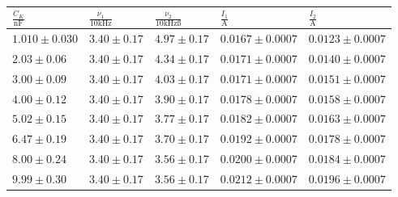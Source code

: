 \documentclass[11pt,ngerman,a4paper]{article}
\begin{document}
\begin{table}
\centering
\begin{tabular}{lllll}
\toprule
{$\frac{C_K}{\si{\nano\farad}}$} &{ $\frac{\nu_1}{10\si{\kilo\Hz}}$} &{ $\frac{\nu_2}{10\si{\kilo\Hz}ß}$} &{ $\frac{I_1}{\si{\ampere}}$} &{ $\frac{I_2}{\si{\ampere}}$ }\\
\midrule
 $1.010 \pm 0.030$  & $3.40 \pm 0.17$   & $4.97 \pm 0.17$  & $0.0167 \pm 0.0007$  & $0.0123 \pm 0.0007$ \\
 $2.03 \pm 0.06$  & $3.40 \pm 0.17$  & $4.34 \pm 0.17$  & $0.0171 \pm 0.0007$  & $0.0140 \pm 0.0007$ \\
 $3.00 \pm 0.09$  & $3.40 \pm 0.17 $  & $4.03 \pm 0.17$  & $0.0171 \pm 0.0007$  & $0.0151 \pm 0.0007$ \\
 $4.00 \pm 0.12$  & $3.40 \pm 0.17 $  & $3.90 \pm 0.17$  & $0.0178 \pm 0.0007$  & $0.0158 \pm 0.0007$ \\
 $5.02 \pm 0.15$  & $3.40 \pm 0.17$  & $3.77 \pm 0.17$  & $0.0182 \pm 0.0007$  & $0.0163 \pm 0.0007$ \\
 $6.47 \pm 0.19$  & $3.40 \pm 0.17$  & $3.70 \pm 0.17$  & $0.0192 \pm 0.0007$  & $0.0178 \pm 0.0007$ \\
 $8.00 \pm 0.24$  & $3.40 \pm 0.17$  & $3.56 \pm 0.17$  & $0.0200 \pm 0.0007$  & $0.0184 \pm 0.0007$ \\
 $9.99 \pm 0.30$  & $3.40 \pm 0.17 $  & $3.56 \pm 0.17$  & $0.0212 \pm 0.0007$  & $0.0196 \pm 0.0007$ \\
\bottomrule
\end{tabular}
\label{}
\caption{}
\end{table}
\end{document}
